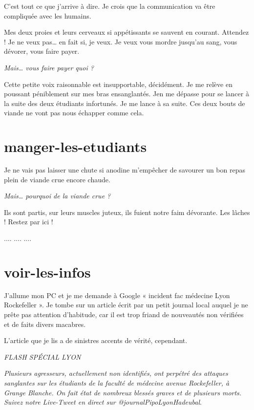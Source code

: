 C'est tout ce que j'arrive à dire. Je crois que la communication va être compliquée avec les humains.

Mes deux proies et leurs cerveaux si appétissants se sauvent en courant. Attendez ! Je ne veux pas… en fait si, je veux. Je veux vous mordre jusqu'au sang, vous dévorer, vous faire payer.

\textit{Mais… vous faire payer quoi ?}

Cette petite voix raisonnable est insupportable, décidément. Je me relève en poussant péniblement sur mes bras ensanglantés. Jen me dépasse pour se lancer à la suite des deux étudiants infortunés. Je me lance à sa suite. Ces deux bouts de viande ne vont pas nous échapper comme cela.

\section{manger-les-etudiants} 

Je ne vais pas laisser une chute si anodine m'empêcher de savourer un bon repas plein de viande crue encore chaude.

\textit{Mais… pourquoi de la viande crue ?}

Ils sont partis, sur leurs muscles juteux, ils fuient notre faim dévorante. Les lâches ! Restez par ici !

.... .... ....

\section{voir-les-infos}

J'allume mon PC et je me demande à Google « incident fac médecine Lyon Rockefeller ». Je tombe sur un article écrit par un petit journal local auquel je ne prête pas attention d'habitude, car il est trop friand de nouveautés non vérifiées et de faits divers macabres.

L'article que je lis a de sinistres accents de vérité, cependant.

\begin{center}
\textit{FLASH SPÉCIAL LYON}

\textit{Plusieurs agresseurs, actuellement non identifiés, ont perpétré des attaques sanglantes sur les étudiants de la faculté de médecine avenue Rockefeller, à Grange Blanche. On fait état de nombreux blessés graves et de plusieurs morts. Suivez notre Live-Tweet en direct sur @journalPipoLyonHadeubal}.
\end{center}

